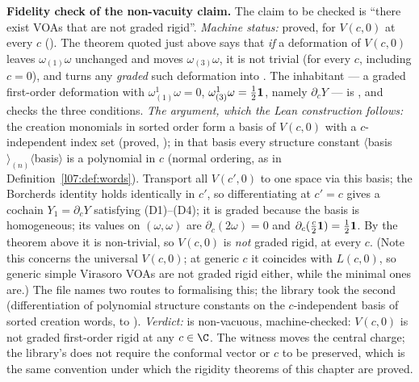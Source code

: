 \begin{dictionary}
\textbf{Fidelity check of the non-vacuity claim.} The claim to be checked is ``there exist VOAs that are not graded
rigid''. \emph{Machine status:} proved, for $V(c,0)$ at every $c$ (\allowbreak{}\allowbreak{}\allowbreak{}\allowbreak{}). The theorem
quoted just above says that \emph{if} a deformation of $V(c,0)$ leaves
$\omega_{(1)}\omega$ unchanged and moves $\omega_{(3)}\omega$, it is not trivial (for every $c$, including $c = 0$), and
 turns any \emph{graded} such deformation into .
The inhabitant --- a graded first-order deformation with
$\omega^1_{(1)}\omega = 0$, $\omega^1_{(3)}\omega = \frac12\mathbf{1}$, namely $\partial_cY$ --- is , and
 checks the three conditions. \emph{The argument, which the Lean construction follows:}
the creation monomials in sorted order form a basis of $V(c,0)$ with a $c$-independent index set (proved,
); in that basis every structure constant $\langle$basis$\rangle_{(n)}\langle$basis$\rangle$ is a polynomial in $c$
(normal ordering, as in Definition~\ref{l07:def:words}). Transport all $V(c',0)$ to one space via this basis; the
Borcherds identity holds identically in $c'$, so differentiating at $c' = c$ gives a cochain $Y_1 = \partial_cY$ satisfying
(D1)--(D4); it is graded because the basis is homogeneous; its values on $(\omega,\omega)$ are $\partial_c(2\omega) = 0$ and
$\partial_c(\frac c2\mathbf{1}) = \frac12\mathbf{1}$. By the theorem above it is non-trivial, so $V(c,0)$ is \emph{not} graded rigid, at
every $c$. (Note this concerns the universal $V(c,0)$; at generic $c$ it coincides with $L(c,0)$, so generic simple
Virasoro VOAs are not graded rigid either, while the minimal ones are.) The file  names two routes
to formalising this; the library took the second (differentiation of polynomial structure constants on the
$c$-independent basis of sorted creation words,  to ).
\emph{Verdict:}  is non-vacuous, machine-checked: $V(c,0)$ is not graded first-order rigid at any
$c\in\C$. The witness moves the central charge; the library's  does not require the conformal
vector or $c$ to be preserved, which is the same convention under which the rigidity theorems of this chapter are proved.
\end{dictionary}

